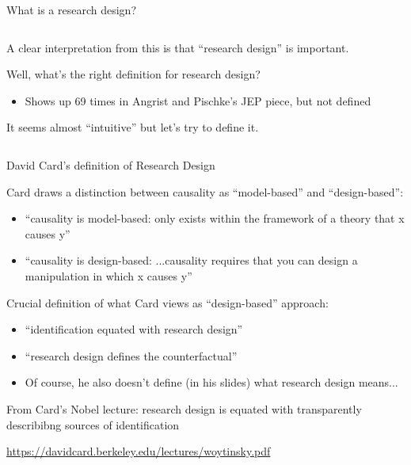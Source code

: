 \documentclass[notes,11pt, aspectratio=169]{beamer}
\newenvironment{wideitemize}{\itemize\addtolength{\itemsep}{10pt}}{\enditemize}
\begin{document}
\begin{frame}{What is a research design?}
\begin{columns}[T] %
  \begin{column}{.7\textwidth}
    \begin{wideitemize}
    \item A clear interpretation from this is that ``research design''
      is important.
    \item Well, what's the right definition for research design?
      \begin{itemize}
      \item Shows up 69 times in Angrist and Pischke's JEP piece, but not defined 
      \end{itemize}
    \item It seems almost ``intuitive'' but let's try to define it.
    \end{wideitemize}
\end{column}%
\hfill%
\begin{column}{.6\textwidth}
\end{column}%
\end{columns}
\end{frame}

\begin{frame}{David Card's definition of Research Design}
  \begin{wideitemize}
  \item Card draws a distinction between causality as ``model-based'' and ``design-based'':
    \begin{itemize}
    \item ``causality is model-based: only exists within the framework of a theory that x causes y''
    \item ``causality is design-based: ...causality requires that you can design a manipulation in which x causes y''
    \end{itemize}
  \item Crucial definition of what Card views as ``design-based'' approach:
    \begin{itemize}
    \item ``identification equated with research design''
    \item ``research design defines the counterfactual''
    \item Of course, he also doesn't define (in his slides) what research design means...
    \end{itemize}
  \item From Card's Nobel lecture: research design is equated with
    transparently describibng sources of identification
    \item   \url{https://davidcard.berkeley.edu/lectures/woytinsky.pdf}
  \end{wideitemize}
\end{frame}
\end{document}
